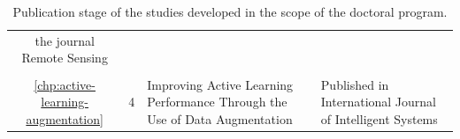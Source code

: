 \begin{table}
\begin{tabular}{ccm{}m{}}
                                                                                         the journal 
                                                                                         Remote Sensing   \\
        \vspace{-.2cm}\\
        \ref{chp:active-learning-augmentation} & 4 & Improving Active Learning 
                                                   Performance Through the Use of
                                                   Data Augmentation
                                               & Published in International
                                               Journal of Intelligent Systems   \\
        \bottomrule
    \end{tabular}
    \caption{\label{tab:studies}
        Publication stage of the studies developed in the scope of the doctoral
        program.
    }
\end{table}
